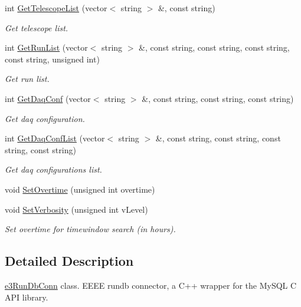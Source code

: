 \begin{DoxyCompactItemize}
int \hyperlink{classe3RunDbConn_a09fea2023c17c05ef1b3bcff2773ec3e}{GetTelescopeList} (vector$<$ string $>$ \&, const string)
\begin{DoxyCompactList}\small\item\em Get telescope list. \item\end{DoxyCompactList}\item 
int \hyperlink{classe3RunDbConn_a42b34d56f7c154eb2132468996e476fd}{GetRunList} (vector$<$ string $>$ \&, const string, const string, const string, const string, unsigned int)
\begin{DoxyCompactList}\small\item\em Get run list. \item\end{DoxyCompactList}\item 
int \hyperlink{classe3RunDbConn_a2143f8e6b78e0a1a320be37b963a4ba6}{GetDaqConf} (vector$<$ string $>$ \&, const string, const string, const string)
\begin{DoxyCompactList}\small\item\em Get daq configuration. \item\end{DoxyCompactList}\item 
int \hyperlink{classe3RunDbConn_a7713cac73355f298e954c568217b59ba}{GetDaqConfList} (vector$<$ string $>$ \&, const string, const string, const string, const string)
\begin{DoxyCompactList}\small\item\em Get daq configurations list. \item\end{DoxyCompactList}\item 
void \hyperlink{classe3RunDbConn_a671dda122e528e9d6022299fcbe0f9dd}{SetOvertime} (unsigned int overtime)
\item 
void \hyperlink{classe3RunDbConn_a1c96ff8447ad019cbd22957d55a70845}{SetVerbosity} (unsigned int vLevel)
\begin{DoxyCompactList}\small\item\em Set overtime for timewindow search (in hours). \item\end{DoxyCompactList}\end{DoxyCompactItemize}


\subsection{Detailed Description}
\hyperlink{classe3RunDbConn}{e3RunDbConn} class. EEEE rundb connector, a C++ wrapper for the MySQL C API library. 

